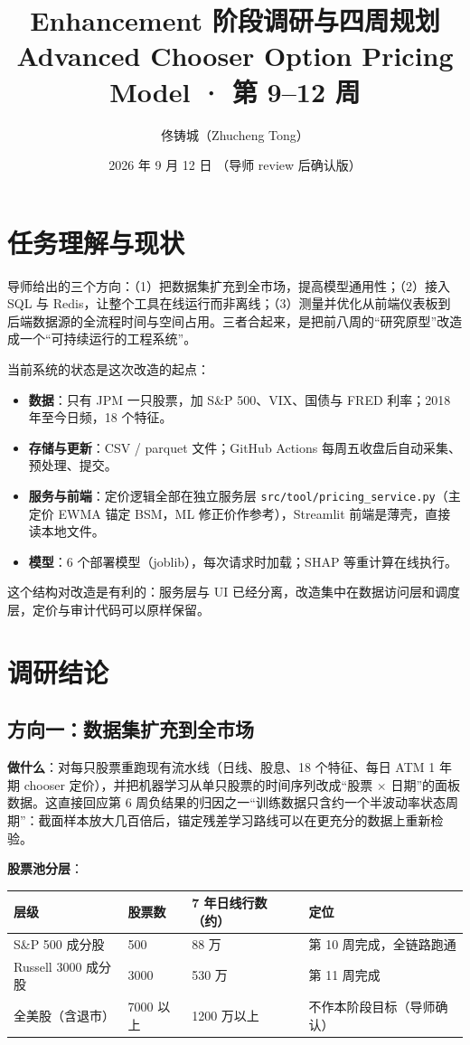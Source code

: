 \documentclass[11pt]{ctexart}
\title{\textbf{Enhancement 阶段调研与四周规划}\\
\large Advanced Chooser Option Pricing Model · 第 9--12 周}
\author{佟铸城（Zhucheng Tong）}
\date{2026 年 9 月 12 日 \quad（导师 review 后确认版）}
\begin{document}
\maketitle

\section{任务理解与现状}

导师给出的三个方向：（1）把数据集扩充到全市场，提高模型通用性；（2）接入 SQL 与 Redis，让整个工具在线运行而非离线；（3）测量并优化从前端仪表板到后端数据源的全流程时间与空间占用。三者合起来，是把前八周的“研究原型”改造成一个“可持续运行的工程系统”。

当前系统的状态是这次改造的起点：
\begin{itemize}
  \item \textbf{数据}：只有 JPM 一只股票，加 S\&P 500、VIX、国债与 FRED 利率；2018 年至今日频，18 个特征。
  \item \textbf{存储与更新}：CSV / parquet 文件；GitHub Actions 每周五收盘后自动采集、预处理、提交。
  \item \textbf{服务与前端}：定价逻辑全部在独立服务层 \texttt{src/tool/pricing\_service.py}（主定价 EWMA 锚定 BSM，ML 修正价作参考），Streamlit 前端是薄壳，直接读本地文件。
  \item \textbf{模型}：6 个部署模型（joblib），每次请求时加载；SHAP 等重计算在线执行。
\end{itemize}
这个结构对改造是有利的：服务层与 UI 已经分离，改造集中在数据访问层和调度层，定价与审计代码可以原样保留。

\section{调研结论}

\subsection{方向一：数据集扩充到全市场}

\textbf{做什么}：对每只股票重跑现有流水线（日线、股息、18 个特征、每日 ATM 1 年期 chooser 定价），并把机器学习从单只股票的时间序列改成“股票 $\times$ 日期”的面板数据。这直接回应第 6 周负结果的归因之一“训练数据只含约一个半波动率状态周期”：截面样本放大几百倍后，锚定残差学习路线可以在更充分的数据上重新检验。

\begin{minipage}{\linewidth}
\textbf{股票池分层}：
\begin{center}\small
\begin{tabular}{llll}
\toprule
层级 & 股票数 & 7 年日线行数（约） & 定位 \\
\midrule
S\&P 500 成分股 & 500 & 88 万 & 第 10 周完成，全链路跑通 \\
Russell 3000 成分股 & 3000 & 530 万 & 第 11 周完成 \\
全美股（含退市） & 7000 以上 & 1200 万以上 & 不作本阶段目标（导师确认） \\
\bottomrule
\end{tabular}
\end{center}
\end{minipage}
\end{document}
